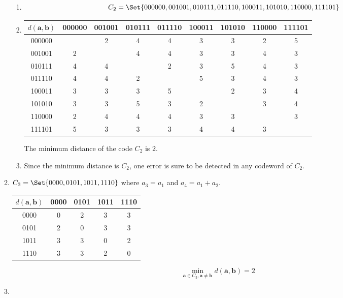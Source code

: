 \begin{enumerate}[label={\Alph*.},font={\bfseries}]
\begin{enumerate}[label={\arabic*},font={\bfseries}]
\begin{enumerate}[label={(\alph*)}]
    \item
      \[
      C_2 = \Set{
        000000,
        001001,
        010111,
        011110,
        100011,
        101010,
        110000,
        111101
      }
      \]
    \item
      \begin{center}
        \begin{tabular}{ c | c c c c c c c c }
          $d(\mathbf{a}, \mathbf{b})$ & 000000 & 001001 & 010111 & 011110 & 100011 & 101010 & 110000 & 111101 \\
          \hline
          000000 &   & 2 & 4 & 4 & 3 & 3 & 2 & 5 \\
          001001 & 2 &  & 4 & 4 & 3 & 3 & 4 & 3 \\
          010111 & 4 & 4 &   & 2 & 3 & 5 & 4 & 3 \\
          011110 & 4 & 4 & 2 &   & 5 & 3 & 4 & 3 \\
          100011 & 3 & 3 & 3 & 5 &   & 2 & 3 & 4 \\
          101010 & 3 & 3 & 5 & 3 & 2 &   & 3 & 4 \\
          110000 & 2 & 4 & 4 & 4 & 3 & 3 &   & 3 \\
          111101 & 5 & 3 & 3 & 3 & 4 & 4 & 3 &
        \end{tabular}
      \end{center}
      The minimum distance of the code $C_2$ is $2$.
      \item Since the minimum distance is $C_2$, one error is sure to be
        detected in any codeword of $C_2$.
    \end{enumerate}
  \item $C_3 = \Set{0000,0101,1011,1110}$ where $a_3 = a_1$ and $a_4 = a_1+a_2$.
    \begin{center}
      \begin{tabular}{ c | c c c c }
        $d(\mathbf{a}, \mathbf{b})$ & 0000 & 0101 & 1011 & 1110 \\
        \hline
        0000 & 0 & 2 & 3 & 3 \\
        0101 & 2 & 0 & 3 & 3 \\
        1011 & 3 & 3 & 0 & 2 \\
        1110 & 3 & 3 & 2 & 0
      \end{tabular}
      \end{center}
    $$\min_{\mathbf{a} \in C_3, \mathbf{a}\ne\mathbf{b}} d(\mathbf{a}, \mathbf{b}) = 2$$
  \item

\end{enumerate}
\end{enumerate}
